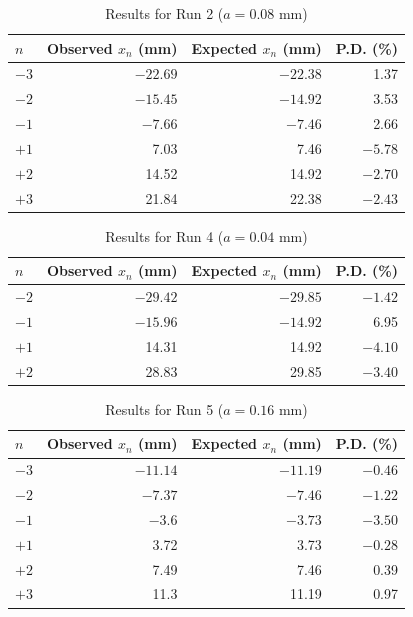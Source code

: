 %
\newpage
\begin{table}[ht!]
    \centering
    \begin{tabular}{|l|r|r|r|}
        \hline
        $n$ & Observed $x_{n}$ (mm) & Expected $x_{n}$ (mm) & P.D. (\%) \\
        \hline
        $-3$ & $-22.69$ & $-22.38$ & 1.37 \\
        $-2$ & $-15.45$ & $-14.92$ & 3.53 \\
        $-1$ & $-7.66$ & $-7.46$ & 2.66 \\
        \hline
        $+1$ & 7.03 & 7.46 & $-5.78$ \\
        $+2$ & 14.52 & 14.92 & $-2.70$ \\
        $+3$ & 21.84 & 22.38 & $-2.43$ \\
        \hline
    \end{tabular}
    \caption{Results for Run 2 ($a = 0.08$ mm)}
    \label{table.11.results.12}
\end{table}
%
\begin{table}[ht!]
    \centering
    \begin{tabular}{|l|r|r|r|}
        \hline
        $n$ & Observed $x_{n}$ (mm) & Expected $x_{n}$ (mm) & P.D. (\%) \\
        \hline
        $-2$ & $-29.42$ & $-29.85$ & $-1.42$ \\
        $-1$ & $-15.96$ & $-14.92$ & 6.95 \\
        \hline
        $+1$ & 14.31 & 14.92 & $-4.10$ \\
        $+2$ & 28.83 & 29.85 & $-3.40$ \\
        \hline
    \end{tabular}
    \caption{Results for Run 4 ($a = 0.04$ mm)}
    \label{table.11.results.34}
\end{table}
%
\begin{table}[ht!]
    \centering
    \begin{tabular}{|l|r|r|r|}
        \hline
        $n$ & Observed $x_{n}$ (mm) & Expected $x_{n}$ (mm) & P.D. (\%) \\
        \hline
        $-3$ & $-11.14$ & $-11.19$ & $-0.46$ \\
        $-2$ & $-7.37$ & $-7.46$ & $-1.22$ \\
        $-1$ & $-3.6$ & $-3.73$ & $-3.50$ \\
        \hline
        $+1$ & 3.72 & 3.73 & $-0.28$ \\
        $+2$ & 7.49 & 7.46 & 0.39 \\
        $+3$ & 11.3 & 11.19 & 0.97 \\
        \hline
    \end{tabular}
    \caption{Results for Run 5 ($a = 0.16$ mm)}
    \label{table.11.results.56}
\end{table}
